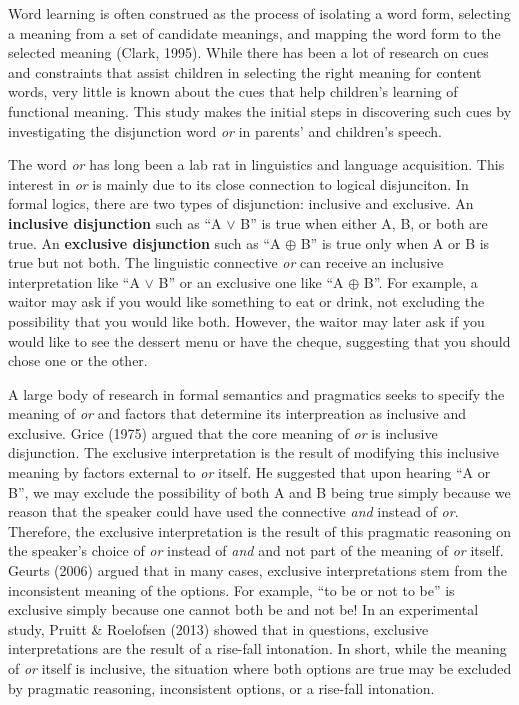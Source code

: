 \documentclass[10pt, letterpaper]{article}
\begin{document}
Word learning is often construed as the process of isolating a word
form, selecting a meaning from a set of candidate meanings, and mapping
the word form to the selected meaning (Clark, 1995). While there has
been a lot of research on cues and constraints that assist children in
selecting the right meaning for content words, very little is known
about the cues that help children's learning of functional meaning. This
study makes the initial steps in discovering such cues by investigating
the disjunction word \emph{or} in parents' and children's speech.

The word \emph{or} has long been a lab rat in linguistics and language
acquisition. This interest in \emph{or} is mainly due to its close
connection to logical disjunciton. In formal logics, there are two types
of disjunction: inclusive and exclusive. An \textbf{inclusive
disjunction} such as ``A \(\vee\) B'' is true when either A, B, or both
are true. An \textbf{exclusive disjunction} such as ``A \(\oplus\) B''
is true only when A or B is true but not both. The linguistic connective
\emph{or} can receive an inclusive interpretation like ``A \(\vee\) B''
or an exclusive one like ``A \(\oplus\) B''. For example, a waitor may
ask if you would like something to eat or drink, not excluding the
possibility that you would like both. However, the waitor may later ask
if you would like to see the dessert menu or have the cheque, suggesting
that you should chose one or the other.

A large body of research in formal semantics and pragmatics seeks to
specify the meaning of \emph{or} and factors that determine its
interpreation as inclusive and exclusive. Grice (1975) argued that the
core meaning of \emph{or} is inclusive disjunction. The exclusive
interpretation is the result of modifying this inclusive meaning by
factors external to \emph{or} itself. He suggested that upon hearing ``A
or B'', we may exclude the possibility of both A and B being true simply
because we reason that the speaker could have used the connective
\emph{and} instead of \emph{or}. Therefore, the exclusive interpretation
is the result of this pragmatic reasoning on the speaker's choice of
\emph{or} instead of \emph{and} and not part of the meaning of \emph{or}
itself. Geurts (2006) argued that in many cases, exclusive
interpretations stem from the inconsistent meaning of the options. For
example, ``to be or not to be'' is exclusive simply because one cannot
both be and not be! In an experimental study, Pruitt \& Roelofsen (2013)
showed that in questions, exclusive interpretations are the result of a
rise-fall intonation. In short, while the meaning of \emph{or} itself is
inclusive, the situation where both options are true may be excluded by
pragmatic reasoning, inconsistent options, or a rise-fall intonation.
\end{document}
